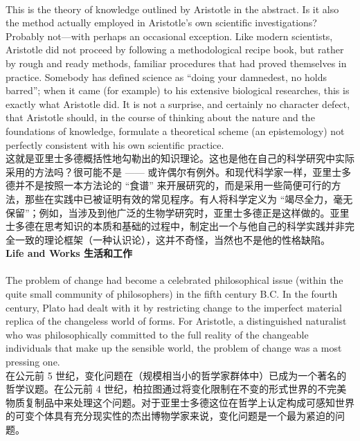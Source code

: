 \documentclass{article}
\begin{document}
\\
This is the theory of knowledge outlined by Aristotle in the abstract. Is it also the method actually employed in Aristotle’s own scientific investigations? Probably not—with perhaps an occasional exception. Like modern scientists, Aristotle did not proceed by following a methodological recipe book, but rather by rough and ready methods, familiar procedures that had proved themselves in practice. Somebody has defined science as “doing your damnedest, no holds barred”; when it came (for example) to his extensive biological researches, this is exactly what Aristotle did. It is not a surprise, and certainly no character defect, that Aristotle should, in the course of thinking about the nature and the foundations of knowledge, formulate a theoretical scheme (an epistemology) not perfectly consistent with his own scientific practice.\\
这就是亚里士多德概括性地勾勒出的知识理论。这也是他在自己的科学研究中实际采用的方法吗？很可能不是 —— 或许偶尔有例外。和现代科学家一样，亚里士多德并不是按照一本方法论的 “食谱” 来开展研究的，而是采用一些简便可行的方法，那些在实践中已被证明有效的常见程序。有人将科学定义为 “竭尽全力，毫无保留”；例如，当涉及到他广泛的生物学研究时，亚里士多德正是这样做的。亚里士多德在思考知识的本质和基础的过程中，制定出一个与他自己的科学实践并非完全一致的理论框架（一种认识论），这并不奇怪，当然也不是他的性格缺陷。\\

\noindent\textbf{Life and Works 生活和工作}\\
\\
The problem of change had become a celebrated philosophical issue (within the quite small community of philosophers) in the fifth century B.C. In the fourth century, Plato had dealt with it by restricting change to the imperfect material replica of the changeless world of forms. For Aristotle, a distinguished naturalist who was philosophically committed to the full reality of the changeable individuals that make up the sensible world, the problem of change was a most pressing one.\\
在公元前 5 世纪，变化问题在（规模相当小的哲学家群体中）已成为一个著名的哲学议题。在公元前 4 世纪，柏拉图通过将变化限制在不变的形式世界的不完美物质复制品中来处理这个问题。对于亚里士多德这位在哲学上认定构成可感知世界的可变个体具有充分现实性的杰出博物学家来说，变化问题是一个最为紧迫的问题。\\
\end{document}
